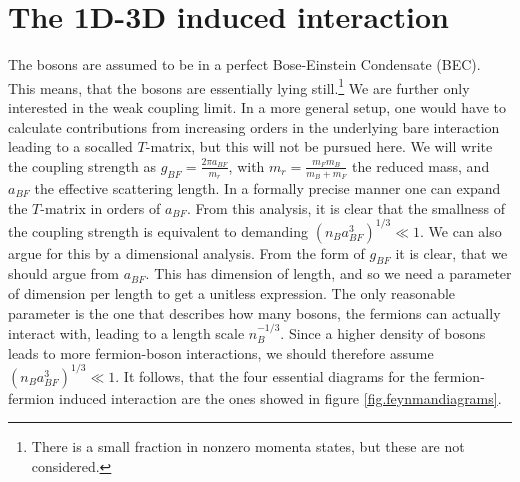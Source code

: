 \section{The 1D-3D induced interaction}
The bosons are assumed to be in a perfect Bose-Einstein Condensate (BEC). This means, that the bosons are essentially lying still.\footnote{There is a small fraction in nonzero momenta states, but these are not considered.}  We are further only interested in the weak coupling limit. In a more general setup, one would have to calculate contributions from increasing orders in the underlying bare interaction leading to a socalled $T$-matrix, but this will not be pursued here. We will write the coupling strength as $g_{BF} = \frac{2\pi a_{BF}}{m_r}$, with $m_r = \frac{m_Fm_B}{m_B + m_F}$ the reduced mass, and $a_{BF}$ the effective scattering length. In a formally precise manner one can expand the $T$-matrix in orders of $a_{BF}$. From this analysis, it is clear that the smallness of the coupling strength is equivalent to demanding $(n_Ba_{BF}^3)^{1/3}\ll 1$. We can also argue for this by a dimensional analysis. From the form of $g_{BF}$ it is clear, that we should argue from $a_{BF}$. This has dimension of length, and so we need a parameter of dimension per length to get a unitless expression. The only reasonable parameter is the one that describes how many bosons, the fermions can actually interact with, leading to a length scale $n_B^{-1/3}$. Since a higher density of bosons leads to more fermion-boson interactions, we should therefore assume $(n_Ba_{BF}^3)^{1/3} \ll 1$. It follows, that the four essential diagrams for the fermion-fermion induced interaction are the ones showed in figure \ref{fig.feynmandiagrams}. 

